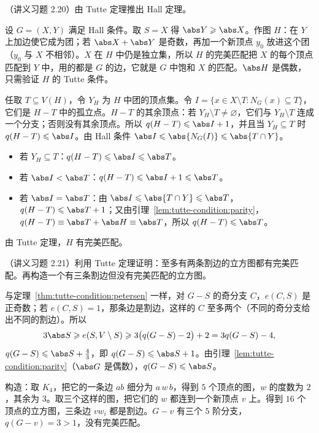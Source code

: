 \begin{workedexample}\label{we:tutte-condition:hall}
（讲义习题 2.20）由 Tutte 定理推出 Hall 定理。
\end{workedexample}
\begin{solution}
设 $G=(X,Y)$ 满足 Hall 条件。取 $S=X$ 得 $\abs Y\geqslant\abs X$。作图 $H$：在 $Y$ 上加边使它成为团；若 $\abs X+\abs Y$ 是奇数，再加一个新顶点 $y_0$ 放进这个团（$y_0$ 与 $X$ 不相邻）。$X$ 在 $H$ 中仍是独立集，所以 $H$ 的完美匹配把 $X$ 的每个顶点匹配到 $Y$ 中，用的都是 $G$ 的边，它就是 $G$ 中饱和 $X$ 的匹配。$\abs H$ 是偶数，只需验证 $H$ 的 Tutte 条件。

任取 $T\subseteq V(H)$，令 $Y_H$ 为 $H$ 中团的顶点集。令 $I=\{x\in X\setminus T:N_G(x)\subseteq T\}$，它们是 $H-T$ 中的孤立点。$H-T$ 的其余顶点：若 $Y_H\setminus T\neq\varnothing$，它们与 $Y_H\setminus T$ 连成一个分支；否则没有其余顶点。所以 $q(H-T)\leqslant\abs I+1$，并且当 $Y_H\subseteq T$ 时 $q(H-T)\leqslant\abs I$。由 Hall 条件 $\abs I\leqslant\abs{N_G(I)}\leqslant\abs{T\cap Y}$。
\begin{itemize}
\item 若 $Y_H\subseteq T$：$q(H-T)\leqslant\abs I\leqslant\abs T$。
\item 若 $\abs I<\abs T$：$q(H-T)\leqslant\abs I+1\leqslant\abs T$。
\item 若 $\abs I=\abs T$：由 $\abs I\leqslant\abs{T\cap Y}\leqslant\abs T$，$q(H-T)\leqslant\abs T+1$；又由引理~\ref{lem:tutte-condition:parity}，$q(H-T)\equiv\abs T+\abs H\equiv\abs T$，所以 $q(H-T)\leqslant\abs T$。
\end{itemize}
由 Tutte 定理，$H$ 有完美匹配。
\end{solution}

\begin{workedexample}\label{we:tutte-condition:bridges}
（讲义习题 2.21）利用 Tutte 定理证明：至多有两条割边的立方图都有完美匹配。再构造一个有三条割边但没有完美匹配的立方图。
\end{workedexample}
\begin{solution}
与定理~\ref{thm:tutte-condition:petersen} 一样，对 $G-S$ 的奇分支 $C$，$e(C,S)$ 是正奇数；若 $e(C,S)=1$，那条边是割边，这样的 $C$ 至多两个（不同的奇分支给出不同的割边）。所以
\[
3\abs S\geqslant e(S,V\setminus S)\geqslant3\bigl(q(G-S)-2\bigr)+2=3q(G-S)-4,
\]
$q(G-S)\leqslant\abs S+\frac43$，即 $q(G-S)\leqslant\abs S+1$。由引理~\ref{lem:tutte-condition:parity}（$\abs G$ 是偶数），$q(G-S)\leqslant\abs S$。

构造：取 $K_4$，把它的一条边 $ab$ 细分为 $a\,w\,b$，得到 $5$ 个顶点的图，$w$ 的度数为 $2$，其余为 $3$。取三个这样的图，把它们的 $w$ 都连到一个新顶点 $v$ 上。得到 $16$ 个顶点的立方图，三条边 $vw_i$ 都是割边。$G-v$ 有三个 $5$ 阶分支，$q(G-v)=3>1$，没有完美匹配。
\end{solution}

